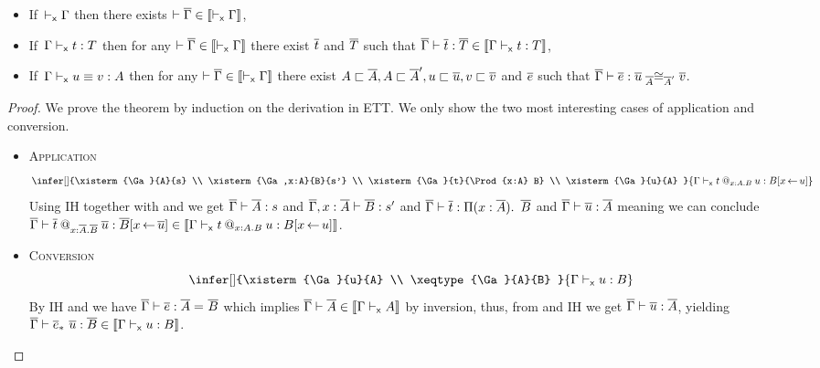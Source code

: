 \begin{theorem}[Translation]
  \leavevmode
  \begin{itemize}
    \item If\,\,\,$\vdash_{\mathsf{x}} \Gamma$ then there exists
    $\vdash \overline{\Gamma} \in \llbracket \vdash_{\mathsf{x}} \Gamma \rrbracket$,

    \item If\,\,\,$\Gamma \vdash_{\mathsf{x}} t : T$ then for any
    $\vdash \overline{\Gamma} \in \llbracket \vdash_{\mathsf{x}} \Gamma \rrbracket$ there exist $\overline{t}$ and $\overline{T}$ such
    that $\overline{\Gamma} \vdash \overline{t} : \overline{T} \in \llbracket \Gamma \vdash_{\mathsf{x}} t : T \rrbracket$,

    \item If\,\,\,$\Gamma \vdash_{\mathsf{x}} u \equiv v : A$ then for any
    $\vdash \overline{\Gamma} \in \llbracket \vdash_{\mathsf{x}} \Gamma \rrbracket$ there exist
    $A \sqsubset \overline{A}, A \sqsubset \overline{A}', u \sqsubset \overline{u}, v \sqsubset \overline{v}$ and $\overline{e}$ such that
    $\overline{\Gamma} \vdash \overline{e} : \overline{u} \mathrel{{}_{\overline{A}}{\cong}_{\overline{A}'}} \overline{v}$.
  \end{itemize}
\end{theorem}

\begin{proof}
  We prove the theorem by induction on the derivation in \acrshort{ETT}.
  We only show the two most interesting cases of application and conversion.

  \begin{itemize}
    \item \textsc{Application}
    \[
      \infer[]
        {\xisterm{\Ga}{A}{s} \\
         \xisterm{\Ga,x:A}{B}{s'} \\
         \xisterm{\Ga}{t}{\Prod{x:A} B} \\
         \xisterm{\Ga}{u}{A}
        }
        {\xisterm{\Ga}{\app{t}{x:A}{B}{u}}{B[x \sto u]}}
    \]
    Using IH together with  and 
    we get $\overline{\Gamma} \vdash \overline{A} : s$ and $\overline{\Gamma},x:\overline{A} \vdash \overline{B} : s'$ and
    $\overline{\Gamma} \vdash \overline{t} : \mathop{\Pi(x:\overline{A}).\ } \overline{B}$ and $\overline{\Gamma} \vdash \overline{u} : \overline{A}$
    meaning we can conclude
    $\overline{\Gamma} \vdash \overline{t}\mathbin{@_{x:\overline{A}.\overline{B}}} \overline{u} : \overline{B}[x \mathop{\leftarrow} \overline{u}]
    \in \llbracket \Gamma \vdash_{\mathsf{x}} t\mathbin{@_{x:A.B}} u : B[x \mathop{\leftarrow} u] \rrbracket$.

    \item \textsc{Conversion}
    \[
      \infer[]
        {\xisterm{\Ga}{u}{A} \\
         \xeqtype{\Ga}{A}{B}
        }
        {\xisterm{\Ga}{u}{B}}
    \]
    By IH and  we have
    $\overline{\Gamma} \vdash \overline{e} : \overline{A} =_{} \overline{B}$ which implies
    $\overline{\Gamma} \vdash \overline{A} \in \llbracket \Gamma \vdash_{\mathsf{x}} A \rrbracket$ by
    inversion, thus, from 
    and IH we get $\overline{\Gamma} \vdash \overline{u} : \overline{A}$, yielding
    $\overline{\Gamma} \vdash \overline{e}_*\ \overline{u} : \overline{B} \in \llbracket \Gamma \vdash_{\mathsf{x}} u : B \rrbracket$.
  \end{itemize}

\end{proof}


